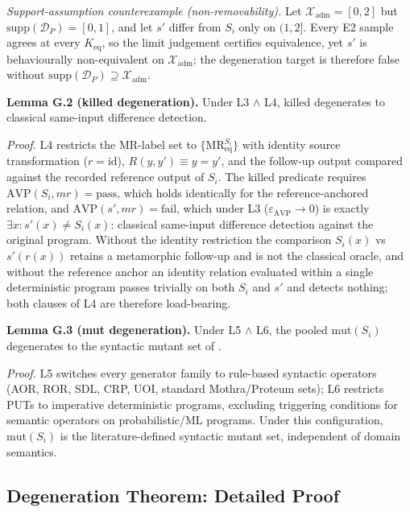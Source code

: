 \documentclass[manuscript,screen,review]{acmart}
\begin{document}
\emph{Support-assumption counterexample (non-removability).} Let
$\mathcal{X}_{\mathrm{adm}} = [0, 2]$ but
$\mathrm{supp}(\mathcal{D}_P) = [0, 1]$, and let $s'$ differ from $S_i$
only on $(1, 2]$. Every E2 sample agrees at every $K_{\mathrm{eq}}$, so
the limit judgement certifies equivalence, yet $s'$ is behaviourally
non-equivalent on $\mathcal{X}_{\mathrm{adm}}$; the degeneration target
is therefore false without
$\mathrm{supp}(\mathcal{D}_P) \supseteq \mathcal{X}_{\mathrm{adm}}$.

\textbf{Lemma G.2 (killed degeneration).} Under L3 $\wedge$ L4, killed
degenerates to classical same-input difference detection.

\emph{Proof.} L4 restricts the MR-label set to
$\{\mathrm{MR}_{\mathrm{eq}}^{S_i}\}$ with identity source
transformation ($r = \mathrm{id}$), $R(y, y') \equiv y = y'$, and the
follow-up output compared against the recorded reference output of
$S_i$. The killed predicate requires
$\mathrm{AVP}(S_i, mr) = \text{pass}$, which holds identically for the
reference-anchored relation, and $\mathrm{AVP}(s', mr) = \text{fail}$,
which under L3 ($\varepsilon_{\mathrm{AVP}} \to 0$) is exactly
$\exists x: s'(x) \neq S_i(x)$: classical same-input difference
detection against the original program. Without the identity
restriction the comparison $S_i(x)$ vs $s'(r(x))$ retains a metamorphic
follow-up and is not the classical oracle, and without the reference
anchor an identity relation evaluated within a single deterministic
program passes trivially on both $S_i$ and $s'$ and detects nothing;
both clauses of L4 are therefore load-bearing.

\textbf{Lemma G.3 (mut degeneration).} Under L5 $\wedge$ L6, the pooled
$\mathrm{mut}(S_i)$
degenerates to the syntactic mutant set of \citet{d7c38286734419b52de4262c9802ebdfcf4b9447}.

\emph{Proof.} L5 switches every generator family to rule-based syntactic operators (AOR,
ROR, SDL, CRP, UOI, standard Mothra/Proteum sets); L6 restricts PUTs
to imperative deterministic programs, excluding triggering conditions
for semantic operators on probabilistic/ML programs. Under this
configuration, $\mathrm{mut}(S_i)$ is the literature-defined syntactic mutant
set, independent of domain semantics.

\subsection{Degeneration Theorem: Detailed Proof}\label{g.4-theorem-9.1-detailed-proof}
\end{document}
